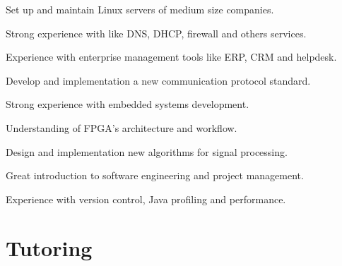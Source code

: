 \documentclass[]{deedy-resume-openfont}
\begin{document}
\begin{minipage}[t]{0.66\textwidth}
\begin{tightemize}
\item Set up and maintain Linux servers of medium size companies.
\item Strong experience with like DNS, DHCP, firewall and others services.
\item Experience with enterprise management tools like ERP, CRM and helpdesk.
\end{tightemize}
\sectionsep

\begin{tightemize}
\item Develop and implementation a new communication protocol standard.
\item Strong experience with embedded systems development.
\item Understanding of FPGA's architecture and workflow.
\end{tightemize}
\sectionsep

\begin{tightemize}
\item Design and implementation new algorithms for signal processing.
\item Great introduction to software engineering and project management.
\item Experience with version control, Java profiling and performance.
\end{tightemize}
\sectionsep

\section{Tutoring}
\sectionsep

\sectionsep

\sectionsep

\end{minipage} 
\end{document}
